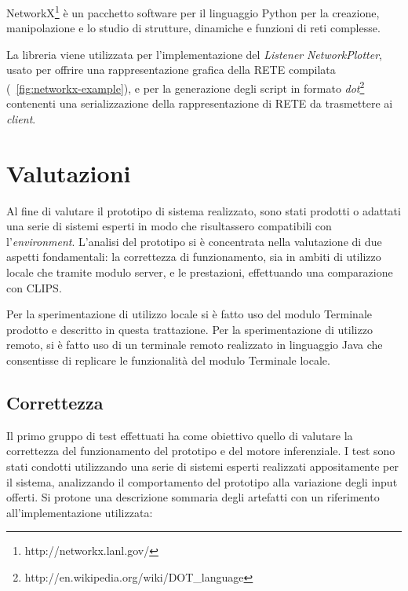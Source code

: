 NetworkX\footnote{http://networkx.lanl.gov/} è un pacchetto software per il linguaggio Python per la creazione, manipolazione e lo studio di strutture, dinamiche e funzioni di reti complesse.

La libreria viene utilizzata per l'implementazione del \emph{Listener} \emph{NetworkPlotter}, usato per offrire una rappresentazione grafica della RETE compilata (\figurename~\ref{fig:networkx-example}), e per la generazione degli script in formato \emph{dot}\footnote{http://en.wikipedia.org/wiki/DOT\_language} contenenti una serializzazione della rappresentazione di RETE da trasmettere ai \emph{client}.

\section{Valutazioni}

Al fine di valutare il prototipo di sistema realizzato, sono stati prodotti o adattati una serie di sistemi esperti in modo che risultassero compatibili con l'\emph{environment}. L'analisi del prototipo si è concentrata nella valutazione di due aspetti fondamentali: la correttezza di funzionamento, sia in ambiti di utilizzo locale che tramite modulo server, e le prestazioni, effettuando una comparazione con CLIPS.

Per la sperimentazione di utilizzo locale si è fatto uso del modulo Terminale prodotto e descritto in questa trattazione. Per la sperimentazione di utilizzo remoto, si è fatto uso di un terminale remoto realizzato in linguaggio Java che consentisse di replicare le funzionalità del modulo Terminale locale.

\subsection{Correttezza}

Il primo gruppo di test effettuati ha come obiettivo quello di valutare la correttezza del funzionamento del prototipo e del motore inferenziale. I test sono stati condotti utilizzando una serie di sistemi esperti realizzati appositamente per il sistema, analizzando il comportamento del prototipo alla variazione degli input offerti. Si protone una descrizione sommaria degli artefatti con un riferimento all'implementazione utilizzata:

